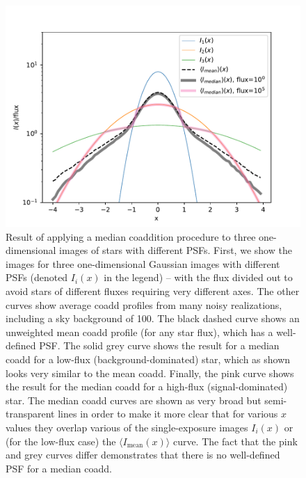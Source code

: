 \documentclass{openjournal}
\newcommand{\irresponse}[1]{{#1}}
\begin{document}
\begin{figure}
\begin{center}
\includegraphics[width=5in]{figures/noisy_median_coadd_psf.pdf}
 \caption{Result of applying a median coaddition procedure to three one-dimensional images of stars with different PSFs. 
 First, we show the images for three one-dimensional Gaussian images with different PSFs (denoted $I_i(x)$ in the legend) -- with the flux divided out to avoid stars of different fluxes requiring very different axes.  The other curves show average coadd profiles from many noisy realizations, including a sky background of 100.  The black dashed curve shows an unweighted mean coadd profile (for any star flux), which has a well-defined PSF.  The solid \irresponse{grey} curve shows the result for a median coadd for a low-flux (background-dominated) star, which as shown looks very similar to the mean coadd.  Finally, the pink curve shows the result for the median coadd for a high-flux (signal-dominated) star.  \irresponse{The median coadd curves are shown as very broad but semi-transparent lines in order to make it more clear that for various $x$ values they overlap various of the single-exposure images $I_i(x)$ or (for the low-flux case) the $\langle I_\text{mean}(x)\rangle$ curve.}
 The fact that the pink and \irresponse{grey} curves differ demonstrates that there is no well-defined PSF for a median coadd.
 }
 \label{fig:median_coadd_psf}
\end{center}
 \end{figure}
\end{document}
